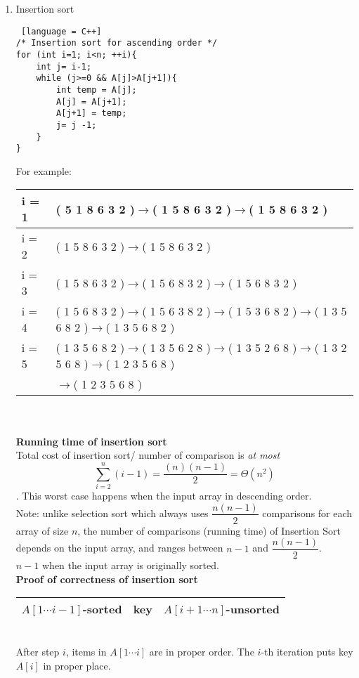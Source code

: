 \documentclass[11pt]{article}
\begin{document}
\begin{enumerate}
\begin{enumerate}
\begin{enumerate}
\item Insertion sort
\begin{lstlisting} [language = C++]
/* Insertion sort for ascending order */
for (int i=1; i<n; ++i){
	int j= i-1;
	while (j>=0 && A[j]>A[j+1]){
		int temp = A[j];
		A[j] = A[j+1];
		A[j+1] = temp;
		j= j -1;	
	}
}
\end{lstlisting}
For example:\\
\begin{tabular}{|l|l|}
\hline
i = 1& ( 5 1 8 6 3 2 )$\rightarrow$( 1 5 8 6 3 2 )$\rightarrow$( 1 5 8 6 3 2 )\\
\hline
i = 2& ( 1 5 8 6 3 2 )$\rightarrow$( 1 5 8 6 3 2 )\\
\hline
i = 3& ( 1 5 8 6 3 2 )$\rightarrow$( 1 5 6 8 3 2 )$\rightarrow$( 1 5 6 8 3 2 )\\
\hline
i = 4& ( 1 5 6 8 3 2 )$\rightarrow$( 1 5 6 3 8 2 )$\rightarrow$( 1 5 3 6 8 2 )$\rightarrow$( 1 3 5 6 8 2 )$\rightarrow$( 1 3 5 6 8 2 )\\
\hline
i = 5& ( 1 3 5 6 8 2 )$\rightarrow$( 1 3 5 6 2 8 )$\rightarrow$( 1 3 5 2 6 8 )$\rightarrow$( 1 3 2 5 6 8 )$\rightarrow$( 1 2 3 5 6 8 )\\
&$\rightarrow$( 1 2 3 5 6 8 )\\
\hline
\end{tabular}\\\\
\textbf{Running time of insertion sort}\\
Total cost of insertion sort/ number of comparison is \textit{at most} $$\sum_{i=2}^{n} (i-1) = \dfrac{(n)(n-1)}{2} = \Theta (n^2)$$
. This worst case happens when the input array in descending order.\\
Note: unlike selection sort which always uses $\dfrac{n(n-1)}{2}$ comparisons for each array of size $n$, the number of comparisons (running time) of Insertion Sort depends on the input array, and ranges between $n-1$ and $\dfrac{n(n-1)}{2}$.\\$n-1$ when the input array is originally sorted.\\
\textbf{Proof of correctness of insertion sort}\\
\begin{tabular}{|p{4cm}|c|p{6cm}|}
\hline
$A[1 \cdots i-1]$-sorted&key& $A[i+1 \cdots n]$-unsorted\\
\hline
\end{tabular}\\
After step $i$, items in $A[1 \cdots i]$ are in proper order. The $i$-th iteration puts key $A[i]$ in proper place.


\end{enumerate}
\end{enumerate}
\end{enumerate}
\end{document}
